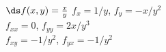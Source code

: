 {$\ds f(x,y) = \frac xy$
}
{$f_x=1/y$, $f_y=-x/y^2$\\
$f_{xx}=0$, $f_{yy}=2x/y^3$\\
$f_{xy}=-1/y^2$, $f_{yx}=-1/y^2$\\
}